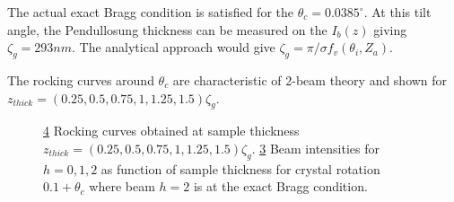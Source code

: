 The actual exact Bragg condition is satisfied for the $\theta_c=0.0385^{\circ}$.
At this tilt angle, the Pendullosung thickness can be measured on the $I_b(z)$ giving $\zeta_g=293nm$.
The analytical approach would give $\zeta_g=\pi/\sigma f_v(\theta_i,Z_a)$.

The rocking curves around $\theta_c$ are characteristic of 2-beam theory and shown for $z_{thick}=\left(0.25,0.5,0.75,1,1.25,1.5\right)\zeta_g$.

\begin{figure}[h!]
	\begin{subfigure}{\textwidth}
		\centering
		\begin{subfigure}{0.45\textwidth}
			\centering
      \def\svgwidth{\columnwidth}
			
			\caption{}\label{fig:2_beam_rocking}
		\end{subfigure}
		\begin{subfigure}{0.45\textwidth}
			\centering
      \def\svgwidth{\columnwidth}
			
			\caption{}\label{fig:2_beam_Itheta_c}
		\end{subfigure}
  \end{subfigure}
	\caption[2-beam extinction]{
		\ref{fig:2_beam_rocking} Rocking curves obtained at sample thickness $z_{thick}=\left(0.25,0.5,0.75,1,1.25,1.5\right)\zeta_g$.
		\ref{fig:2_beam_Itheta_c} Beam intensities for $h=0,1,2$ as function of sample thickness for crystal rotation $0.1+\theta_c$ where beam $h=2$ is at the exact Bragg condition.
	}\label{fig:2_beam_rocking}
\end{figure}



% 
% 
% 

